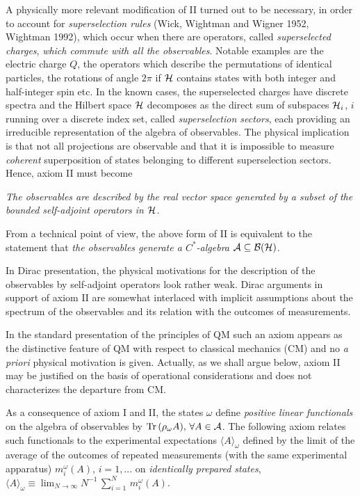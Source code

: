 \documentclass[12pt]{article}
\def \lan   {\langle}
\def \ran   {\rangle}
\def \ra {\rightarrow}
\def \eqq {\equiv}
\def \om {{\omega}}
\def \A {{\cal A}}
\def \B {{\cal B}}
\def \H {\mbox{${\cal H}$}}
\begin{document}
A physically more relevant modification of II turned out to be necessary, in order to account for {\em superselection rules} (Wick, Wightman and Wigner 1952, Wightman 1992), which occur when  there are operators, called {\em superselected charges},  {\em which commute with all the observables}. Notable examples are the electric charge $Q$, the operators which describe the permutations of identical particles, the rotations of angle $2 \pi$ if $\H$ contains states with both integer and half-integer spin etc. In the known cases, the superselected charges have discrete spectra and the Hilbert space $\H$ decomposes as  the direct  sum of subspaces $\H_i$, $i$ running over a discrete index set, called {\em superselection sectors}, each providing an irreducible representation of the algebra of observables. 
The physical implication is that not all projections are observable and that it is impossible  to  measure {\em coherent} superposition of states belonging to different superselection sectors. Hence, axiom II must become


\vspace{1mm}  {\em The observables are described by the real vector space generated by a subset of the bounded self-adjoint operators in $\H$. }
 
From a technical point of view, the above form of II is equivalent to the statement  that {\em the observables generate a $C^*$-algebra $\A \subseteq \B(\H)$}. 

In Dirac presentation, the physical motivations for the descrip\-tion of the observables by self-adjoint operators look rather weak. Dirac arguments in support of axiom II are somewhat interlaced with implicit assumptions about the spectrum of the observables and its relation with the outcomes of  measurements. 

In the standard presentation of the principles of QM
such an axiom appears as the distinctive feature of QM with respect to classical mechanics (CM) and no {\em a priori} physical motivation is given. Actually, as we shall argue below, axiom II may be justified on the basis of operational considerations and does not characterizes the departure from CM.

 As a consequence of axiom I and II, the states $\om$ define {\em positive linear functionals} on the algebra of observables by $ \mbox{Tr}\,(\rho_\om A), \,\forall A \in \A$. The following axiom relates such  functionals to the experimental expectations $\lan A \ran_\omega$ 
 defined by the limit
of the average of the outcomes of repeated measurements (with the same experimental apparatus) $m^\om_i(A)$, $i = 1, ...$ on {\em identically prepared states},  $ \lan A \ran_
\om \eqq \lim_{N \ra \infty} N^{-1} \,\sum_{i = 1}^N \,m^\om_i(A).$ 
 
\end{document}

